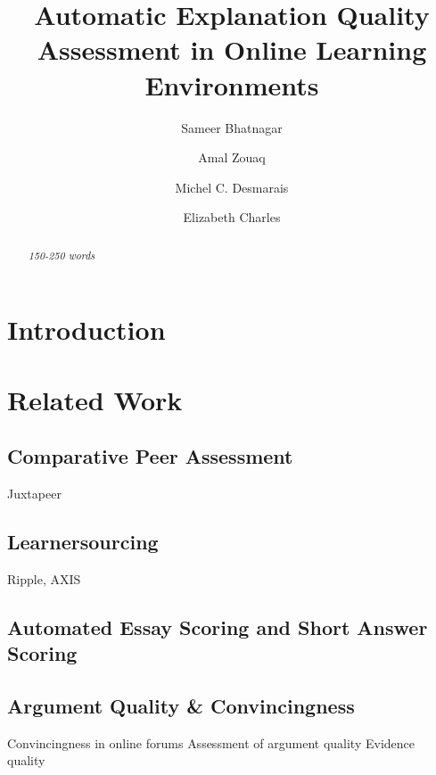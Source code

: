 \documentclass[runningheads]{llncs}
\begin{document}
%
\title{Automatic Explanation Quality Assessment in Online Learning Environments}
%
\author{Sameer Bhatnagar \and
Amal Zouaq \and
Michel C. Desmarais \and
Elizabeth Charles
}
%

%
\maketitle              %
%
\begin{abstract}
\textit{
	150-250 words
}

\end{abstract}


\section{Introduction}

\section{Related Work}

\subsection{Comparative Peer Assessment}
Juxtapeer\cite{cambre_juxtapeer:_2018}
\subsection{Learnersourcing}
Ripple\cite{khosravi_ripple_2019}, AXIS\cite{williams_axis:_2016}

\subsection{Automated Essay Scoring and Short Answer Scoring}


\subsection{Argument Quality \& Convincingness}

Convincingness in online forums \cite{tan_winning_2016}
Assessment of argument quality \cite{toledo_automatic_2019}
Evidence quality \cite{gleize_are_2019}
\end{document}
